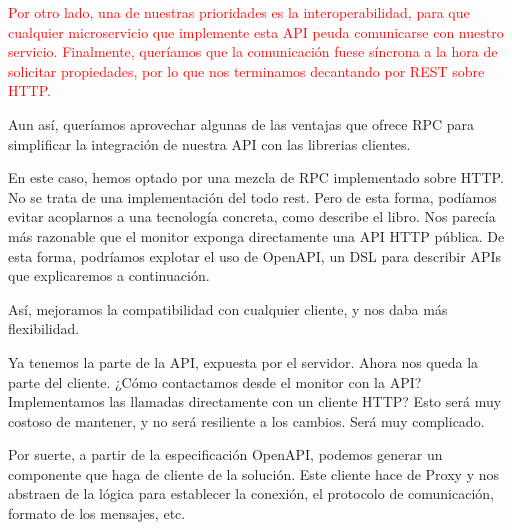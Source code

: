 \textcolor{red}{Por otro lado, una de nuestras prioridades es la interoperabilidad, para que cualquier microservicio que implemente esta API peuda comunicarse con nuestro servicio. Finalmente, queríamos que la comunicación fuese síncrona a la hora de solicitar propiedades, por lo que nos terminamos decantando por REST sobre HTTP.}

Aun así, queríamos aprovechar algunas de las ventajas que ofrece RPC para simplificar la integración de nuestra API con las librerias clientes.


En este caso, hemos optado por una mezcla de RPC implementado sobre HTTP. No se trata de una implementación del todo rest. Pero de esta forma, podíamos evitar acoplarnos a una tecnología concreta, como describe el libro. Nos parecía más razonable que el monitor exponga directamente una API HTTP pública. De esta forma, podríamos explotar el uso de OpenAPI, un DSL para describir APIs que explicaremos a continuación.

Así, mejoramos la compatibilidad con cualquier cliente, y nos daba más flexibilidad.

Ya tenemos la parte de la API, expuesta por el servidor. Ahora nos queda la parte del cliente. ¿Cómo contactamos desde el monitor con la API? Implementamos las llamadas directamente con un cliente HTTP? Esto será muy costoso de mantener, y no será resiliente a los cambios. Será muy complicado.

Por suerte, a partir de la especificación OpenAPI, podemos generar un componente que haga de cliente de la solución. Este cliente hace de Proxy y nos abstraen de la lógica para establecer la conexión, el protocolo de comunicación, formato de los mensajes, etc.


